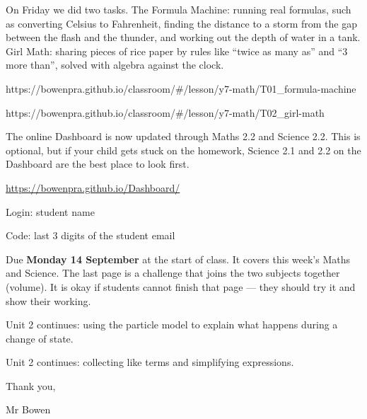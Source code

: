 \documentclass[11pt]{article}
\begin{document}
\begin{annbody}
\vspace{5pt}
On Friday we did two tasks. The Formula Machine: running real formulas, such
as converting Celsius to Fahrenheit, finding the distance to a storm from the
gap between the flash and the thunder, and working out the depth of water in a
tank. Girl Math: sharing pieces of rice paper by rules like ``twice as many
as'' and ``3 more than'', solved with algebra against the clock.\par
\vspace{3pt}%
  {https://bowenpra.github.io/classroom/\#/lesson/y7-math/T01\_formula-machine}\par
\vspace{3pt}%
  {https://bowenpra.github.io/classroom/\#/lesson/y7-math/T02\_girl-math}


The online Dashboard is now updated through Maths 2.2 and Science 2.2. This
is optional, but if your child gets stuck on the homework, Science 2.1 and 2.2
on the Dashboard are the best place to look first.
\par\vspace{4pt}
\href{https://bowenpra.github.io/Dashboard/}{https://bowenpra.github.io/Dashboard/}
\par\vspace{4pt}
Login: student name\par
Code: last 3 digits of the student email


Due \textbf{Monday 14 September} at the start of class. It covers this
week's Maths and Science. The last page is a challenge that joins the two
subjects together (volume). It is okay if students cannot finish that page ---
they should try it and show their working.
\par\vspace{4pt}


Unit 2 continues: using the particle model to explain what happens during a
change of state.

Unit 2 continues: collecting like terms and simplifying expressions.

\vspace{8pt}
Thank you,\par
Mr Bowen

\end{annbody}
\end{document}
